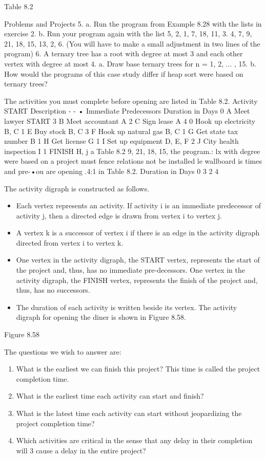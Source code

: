 \documentclass{article}
\begin{document}
Table 8.2 



Problems and Projects 5. a. Run the program from Example 8.28 with the lists in exercise 2. b. Run your program again with the list 5, 2, 1, 7, 18, 11, 3. 4, 7, 9, 21, 18, 15, 13, 2, 6. (You will have to make a small adjustment in two lines of the program) 6. A ternary tree has a root with degree at most 3 and each other vertex with degree at most 4. a. Draw base ternary trees for n = 1, 2, ... , 15. b. How would the programs of this case study differ if heap sort were based on ternary trees? 


The activities you must complete before opening are listed in Table 8.2. 
Activity START Description - - • Immediate Predecessors Duration in Days 0 A Meet lawyer START 3 B Meet accountant A 2 C Sign lease A 4 0 Hook up electricity B, C 1 E Buy stock B, C 3 F Hook up natural gas B, C 1 G Get state tax number B 1 H Get license G 1 I Set up equipment D, E, F 2 J City health inspection I 1 FINISH H, j a 
Table 8.2 
9, 21, 18, 15, the program.: lx with degree were based on 
a project must fence relations not be installed le wallboard is times and pre-•ou are opening .4:1 in Table 8.2. 
Duration in Days 
0 3 2 4 

The activity digraph is constructed as follows. 
\begin{itemize}
    \item Each vertex represents an activity. If activity i is an immediate predecessor of activity j, then a directed edge is drawn from vertex i to vertex j. 
    \item A vertex k is a successor of vertex i if there is an edge in the activity digraph directed from vertex i to vertex k. 
    \item One vertex in the activity digraph, the START vertex, represents the start of the project and, thus, has no immediate pre-decessors. 
    \itme One vertex in the activity digraph, the FINISH vertex, represents the finish of the project and, thus, has no successors. \item The duration of each activity is written beside its vertex. The activity digraph for opening the diner is shown in Figure 8.58. 
\end{itemize}

Figure 8.58 

The questions we wish to answer are: 
\begin{enumerate}
\item What is the earliest we can finish this project? This time is called the project completion time. 
\item What is the earliest time each activity can start and finish? 
\item What is the latest time each activity can start without jeopardizing the project completion time? 
\item Which activities are critical in the sense that any delay in their completion will 3 cause a delay in the entire project? 
\end{enumerate}
\end{document}
